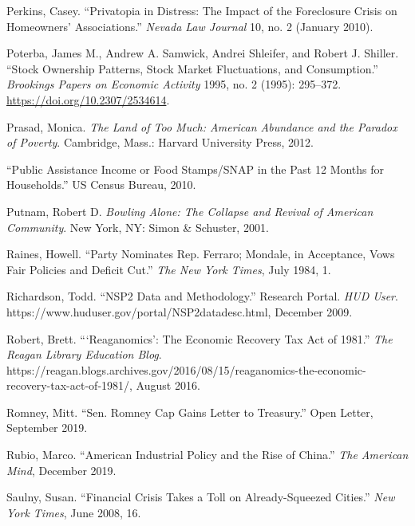 \documentclass[12pt,oneside]{psthesis}
\begin{document}
\leavevmode\hypertarget{ref-perkins2010privatopia}{}%
Perkins, Casey. ``Privatopia in Distress: The Impact of the Foreclosure Crisis on Homeowners' Associations.'' \emph{Nevada Law Journal} 10, no. 2 (January 2010).

\leavevmode\hypertarget{ref-poterba1995stock}{}%
Poterba, James M., Andrew A. Samwick, Andrei Shleifer, and Robert J. Shiller. ``Stock Ownership Patterns, Stock Market Fluctuations, and Consumption.'' \emph{Brookings Papers on Economic Activity} 1995, no. 2 (1995): 295--372. \url{https://doi.org/10.2307/2534614}.

\leavevmode\hypertarget{ref-prasad2012land}{}%
Prasad, Monica. \emph{The Land of Too Much: American Abundance and the Paradox of Poverty}. Cambridge, Mass.: Harvard University Press, 2012.

\leavevmode\hypertarget{ref-2010public}{}%
``Public Assistance Income or Food Stamps/SNAP in the Past 12 Months for Households.'' US Census Bureau, 2010.

\leavevmode\hypertarget{ref-putnam2001bowling}{}%
Putnam, Robert D. \emph{Bowling Alone: The Collapse and Revival of American Community}. New York, NY: Simon \& Schuster, 2001.

\leavevmode\hypertarget{ref-raines1984party}{}%
Raines, Howell. ``Party Nominates Rep. Ferraro; Mondale, in Acceptance, Vows Fair Policies and Deficit Cut.'' \emph{The New York Times}, July 1984, 1.

\leavevmode\hypertarget{ref-richardson2009nsp2}{}%
Richardson, Todd. ``NSP2 Data and Methodology.'' Research Portal. \emph{HUD User}. https://www.huduser.gov/portal/NSP2datadesc.html, December 2009.

\leavevmode\hypertarget{ref-robert2016reaganomics}{}%
Robert, Brett. ```Reaganomics': The Economic Recovery Tax Act of 1981.'' \emph{The Reagan Library Education Blog}. https://reagan.blogs.archives.gov/2016/08/15/reaganomics-the-economic-recovery-tax-act-of-1981/, August 2016.

\leavevmode\hypertarget{ref-romney2019sen}{}%
Romney, Mitt. ``Sen. Romney Cap Gains Letter to Treasury.'' Open Letter, September 2019.

\leavevmode\hypertarget{ref-rubio2019american}{}%
Rubio, Marco. ``American Industrial Policy and the Rise of China.'' \emph{The American Mind}, December 2019.

\leavevmode\hypertarget{ref-saulny2008financial}{}%
Saulny, Susan. ``Financial Crisis Takes a Toll on Already-Squeezed Cities.'' \emph{New York Times}, June 2008, 16.
\end{document}
